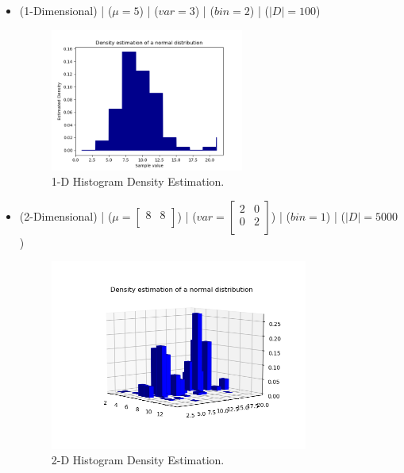 \documentclass[12pt]{article}
\numberwithin{equation}{section}
\numberwithin{table}{section}
\numberwithin{figure}{section}
\begin{document}
\begin{itemize}
	\item (1-Dimensional) | ($\mu = 5$) | ($var = 3$) | ($bin = 2$) | ($|D| = 100$)
	\begin{figure}[!h]\centering
		\includegraphics[width=0.6\textwidth]{3_a_1.PNG}
		\caption{1-D Histogram Density Estimation.}
		\label{pl1}
	\end{figure}
	
	\item (2-Dimensional) | ($\mu = 	\begin{bmatrix}
	8 & 8\\
	\end{bmatrix}$) | ($var = 	\begin{bmatrix}
	2 & 0\\
	0 & 2\\
	\end{bmatrix}$) | ($bin = 1$) | ($|D| = 5000$)
	\begin{figure}[!h]\centering
		\includegraphics[width=0.8\textwidth]{3_a_2.PNG}
		\caption{2-D Histogram Density Estimation.}
		\label{pl1}
	\end{figure}
	
\end{itemize}
\end{document}
